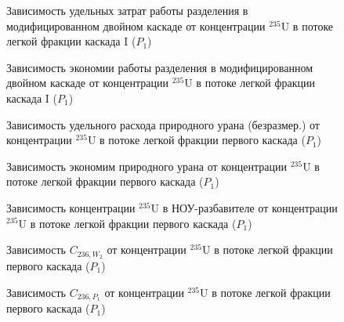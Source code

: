 \begin{figure}[ht]
    \centering
    \begin{minipage}{.5\textwidth}
        \centering
        
  \caption{{Зависимость удельных затрат работы разделения в модифицированном двойном каскаде  от концентрации $^{235}$U в потоке легкой фракции каскада I ($P_1$){\label{SWP1}}}}
  \end{minipage}%
    \begin{minipage}{.5\textwidth}
      \centering
      
\caption{{Зависимость экономии работы разделения в модифицированном двойном каскаде от концентрации $^{235}$U в потоке легкой фракции каскада I ($P_1$){\label{SW_lP1}}}}
    \end{minipage}
\end{figure}

\begin{figure}[ht]
    \centering
    \begin{minipage}{.5\textwidth}
        \centering
        
  \caption{{Зависимость удельного расхода природного урана (безразмер.) от концентрации $^{235}$U в потоке легкой фракции первого каскада ($P_1$){\label{FnuP1}}}}
  \end{minipage}%
    \begin{minipage}{.5\textwidth}
      \centering
      
\caption{{Зависимость экономим природного урана от концентрации $^{235}$U в потоке легкой фракции первого каскада ($P_1$){\label{pFoP1}}}}
    \end{minipage}
\end{figure}


\begin{figure}[ht]
    \centering
    \begin{minipage}{.5\textwidth}
      \centering
      
\caption{{Зависимость концентрации $^{235}$U в НОУ-разбавителе от концентрации $^{235}$U в потоке легкой фракции первого каскада ($P_1$){\label{C235P0}}}}
\end{minipage}
\end{figure}

\begin{figure}[ht]
    \centering
    \begin{minipage}{.5\textwidth}
      \centering
      
      \caption{{Зависимость $C_{236,W_2}$ от концентрации $^{235}$U в потоке легкой фракции первого каскада ($P_1$){\label{C236W2}}}}
    \end{minipage}%
    \begin{minipage}{.5\textwidth}
      \centering
      
      \caption{{Зависимость $C_{236,P_1}$ от концентрации $^{235}$U в потоке легкой фракции первого каскада ($P_1$){\label{C236P1}}}}
  \end{minipage}
  \end{figure}

